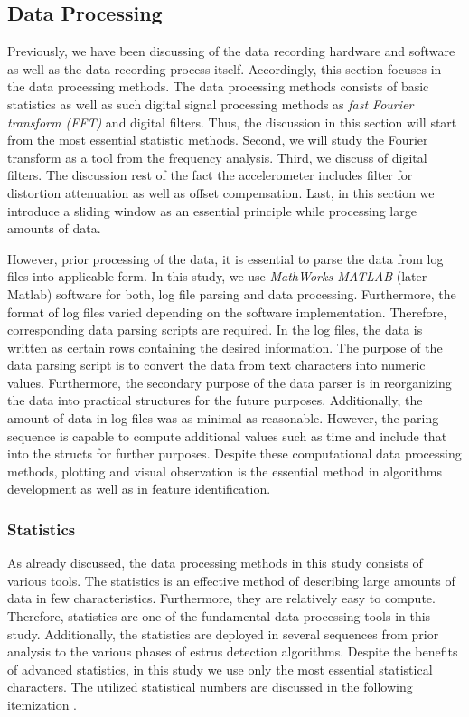 \documentclass[english,12pt,a4paper,pdftex,elec,utf8]{aaltothesis}
\begin{document}
\subsection{Data Processing} \label{dataprocessingsection}

Previously, we have been discussing of the data recording hardware and software as well as the data recording process itself. Accordingly, this section focuses in the data processing methods. The data processing methods consists of basic statistics as well as such digital signal processing methods as \textit{fast Fourier transform (FFT)} and digital filters. Thus, the discussion in this section will start from the most essential statistic methods. Second, we will study the Fourier transform as a tool from the frequency analysis. Third, we discuss of digital filters. The discussion rest of the fact the accelerometer includes filter for distortion attenuation as well as offset compensation. Last, in this section we introduce a sliding window as an essential principle while processing large amounts of data.

However, prior processing of the data, it is essential to parse the data from log files into applicable form. In this study, we use \textit{MathWorks MATLAB} (later Matlab) \cite{matlaboverview} software for both, log file parsing and data processing. Furthermore, the format of log files varied depending on the software implementation. Therefore, corresponding data parsing scripts are required. In the log files, the data is written as certain rows containing the desired information. The purpose of the data parsing script is to convert the data from text characters into numeric values. Furthermore, the secondary purpose of the data parser is in reorganizing the data into practical structures for the future purposes. Additionally, the amount of data in log files was as minimal as reasonable. However, the paring sequence is capable to compute additional values such as time and include that into the structs for further purposes. Despite these computational data processing methods, plotting and visual observation is the essential method in algorithms development as well as in feature identification.

\subsubsection{Statistics} \label{statisticssection}

As already discussed, the data processing methods in this study consists of various tools. The statistics is an effective method of describing large amounts of data in few characteristics. Furthermore, they are relatively easy to compute. Therefore, statistics are one of the fundamental data processing tools in this study. Additionally, the statistics are deployed in several sequences from prior analysis to the various phases of estrus detection algorithms. Despite the benefits of advanced statistics, in this study we use only the most essential statistical characters. The utilized statistical numbers are discussed in the following itemization \cite{maoltaulukotmatematiikka}.
\end{document}
